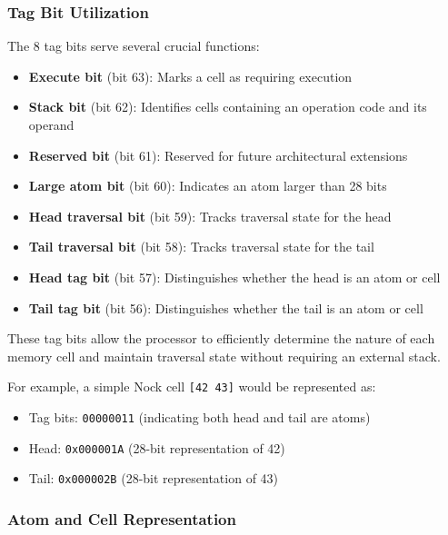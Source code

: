 \documentclass[twoside]{article}
\begin{document}
\subsubsection{Tag Bit Utilization}


The 8 tag bits serve several crucial functions:

\begin{itemize}
  \item \textbf{Execute bit} (bit 63): Marks a cell as requiring execution
  \item \textbf{Stack bit} (bit 62): Identifies cells containing an operation code and its operand
  \item \textbf{Reserved bit} (bit 61): Reserved for future architectural extensions
  \item \textbf{Large atom bit} (bit 60): Indicates an atom larger than 28 bits
  \item \textbf{Head traversal bit} (bit 59): Tracks traversal state for the head
  \item \textbf{Tail traversal bit} (bit 58): Tracks traversal state for the tail
  \item \textbf{Head tag bit} (bit 57): Distinguishes whether the head is an atom or cell
  \item \textbf{Tail tag bit} (bit 56): Distinguishes whether the tail is an atom or cell
\end{itemize}

\noindent
These tag bits allow the processor to efficiently determine the nature of each memory cell and maintain traversal state without requiring an external stack.

For example, a simple Nock cell \texttt{[42 43]} would be represented as:
\begin{itemize}
  \item Tag bits: \texttt{00000011} (indicating both head and tail are atoms)
  \item Head: \texttt{0x000001A} (28-bit representation of 42)
  \item Tail: \texttt{0x000002B} (28-bit representation of 43)
\end{itemize}

\subsubsection{Atom and Cell Representation}
\end{document}
